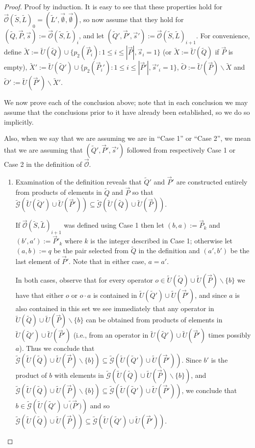 \documentclass{amsbook}
\theoremstyle{plain}
\theoremstyle{definition}
\theoremstyle{remark}
\newcommand{\lst}{\vec}
\newcommand{\set}{\tilde}
\newcommand{\genfun}{\tilde{\mathcal{G}}}
\newcommand{\unpack}{\set U}
\newcommand{\optimizer}{\lst{\mathcal{O}}}
\newcommand{\paren}[1]{\left(#1\right)}
\begin{document}
\begin{proof}
Proof by induction.  It is easy to see that these properties hold for $\optimizer(\set S,\set L)_0=(\set L',\lst\emptyset,\lst\emptyset)$, so now assume that they hold for $(\set Q,\lst P,\lst s):=\optimizer(\set S,\set L)_i$, and let $(\set Q',\lst P',\lst s'):=\optimizer(\set S,\set L)_{i+1}$.  For convenience, define $\set X:=\unpack(\set Q)\cup\{p_2(\lst P_i):1 \le i \le |\lst P|, \lst s_i=1\}$ (or $\set X:=\unpack(\set Q)$ if $\lst P$ is empty), $\set X':=\unpack(\set Q')\cup\{p_2(\lst P_i'):1 \le i \le |\lst P'|, \lst s'_i=1\}$, $\set O:=\unpack(\lst P)\backslash\set X$ and $\set O':=\unpack(\lst P')\backslash\set X'$.

We now prove each of the conclusion above;  note that in each conclusion we may assume that the conclusions prior to it have already been established, so we do so implicitly.

Also, when we say that we are assuming we are in ``Case 1'' or ``Case 2'', we mean that we are assuming that $(\set Q',\lst P',\lst s')$ followed from respectively Case 1 or Case 2 in the definition of $\optimizer$.

\begin{enumerate}
\item

Examination of the definition reveals that $\set Q'$ and $\lst P'$ are constructed entirely from products of elements in $\set Q$ and $\lst P$ so that $\genfun\paren{\set U(\set Q')\cup\set U(\lst P')}\subseteq\genfun\paren{\set U(\set Q)\cup\set U(\lst P)}$.

If $\optimizer(\set S,\set L)_{i+1}$ was defined using Case 1 then let $(b,a):=\lst P_k$ and $(b',a'):=\lst P'_k$ where $k$ is the integer described in Case 1;  otherwise let $(a,b):=q$ be the pair selected from $\set Q$ in the definition and $(a',b')$ be the last element of $\lst P'$.  Note that in either case, $a=a'$.

In both cases, observe that for every operator $o\in\set U(\set Q)\cup\set U(\lst P)\backslash\{b\}$ we have that either $o$ or $o\cdot a$ is contained in $\set U(\set Q')\cup\set U(\lst P')$, and since $a$ is also contained in this set we see immediately that any operator in $\set U(\set Q)\cup\set U(\lst P)\backslash\{b\}$ can be obtained from products of elements in $\set U(\set Q')\cup\set U(\lst P')$ (i.e., from an operator in $\set U(\set Q')\cup\set U(\lst P')$ times possibly $a$).  Thus we conclude that $\genfun\paren{\set U(\set Q)\cup\set U(\lst P)\backslash\{b\}}\subseteq\genfun\paren{\set U(\set Q')\cup\set U(\lst P')}$.  Since $b'$ is the product of $b$ with elements in $\genfun\paren{\set U(\set Q)\cup\set U(\lst P)\backslash\{b\}}$, and $\genfun\paren{\set U(\set Q)\cup\set U(\lst P)\backslash\{b\}}\subseteq\genfun\paren{\set U(\set Q')\cup\set U(\lst P')}$, we conclude that $b\in\genfun\paren{\set U(\set Q')\cup\set(\lst P')}$ and so $\genfun\paren{\set U(\set Q)\cup\set U(\lst P)}\subseteq\genfun\paren{\set U(\set Q')\cup\set U(\lst P')}$.


\end{enumerate}
\end{proof}
\end{document}
